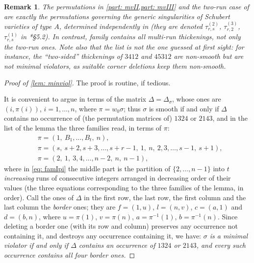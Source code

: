 \documentclass[12pt]{article}
\newtheorem{remark}[theorem]{Remark}
\newcommand{\IM}{\Delta}
\begin{document}
\begin{remark}
The permutations in \cref{part: mvII,part: mvIII} and the two-run case of  are exactly the permutations governing the generic
singularities of Schubert varieties of type $A$, determined independently in \cites{MR1990570,MR1994224,MR2015302,MR1853139}
(they are denoted $\tau^{(2)}_{r,s}$, $\tau^{(3)}_{r,2}$, $\tau^{(1)}_{r,s}$ in \cite{MR3866895}*{\S5.2}).
In contrast, family  contains all multi-run thickenings, not only the two-run ones.
Note also that the list is not the one guessed at first sight: for instance, the ``two-sided'' thickenings of $3412$
and $45312$ are non-smooth but are not minimal violators, as suitable corner deletions keep them non-smooth.
\end{remark}

\begin{proof}[Proof of \cref{lem: minviol}]
The proof is routine, if tedious.

It is convenient to argue in terms of the matrix $\IM=\IM_\sigma$, whose ones are $(i,\pi(i))$, $i=1,\dots,n$,
where $\pi=w_0\sigma$; thus $\sigma$ is smooth if and only if $\IM$ contains no occurrence of (the permutation
matrices of) $1324$ or $2143$, and in the list of the lemma the three families read, in terms of $\pi$:
\begin{align}
&\pi=(1,\ B_1,\dots,B_t,\ n),\label{eq: famIpi}\\
&\pi=(s,\ s+2,s+3,\dots,s+r-1,\ 1,\ n,\ 2,3,\dots,s-1,\ s+1),\label{eq: famIIpi}\\
&\pi=(2,\ 1,\ 3,4,\dots,n-2,\ n,\ n-1),\label{eq: famIIIpi}
\end{align}
where in \cref{eq: famIpi} the middle part is the partition of $\{2,\dots,n-1\}$ into $t$ \emph{increasing} runs of
consecutive integers arranged in decreasing order of their values (the three equations corresponding to the three
families of the lemma, in order).
Call the ones of $\IM$ in the first row, the last row, the first column and the last column the \emph{border} ones;
they are $f=(1,u)$, $l=(n,v)$, $c=(a,1)$ and $d=(b,n)$, where $u=\pi(1)$, $v=\pi(n)$, $a=\pi^{-1}(1)$, $b=\pi^{-1}(n)$.
Since deleting a border one (with its row and column) preserves any occurrence not containing it, and destroys any
occurrence containing it, we have:
\emph{$\sigma$ is a minimal violator if and only if $\IM$ contains an occurrence of $1324$ or $2143$, and every such
occurrence contains all four border ones.}


\end{proof}
\end{document}

